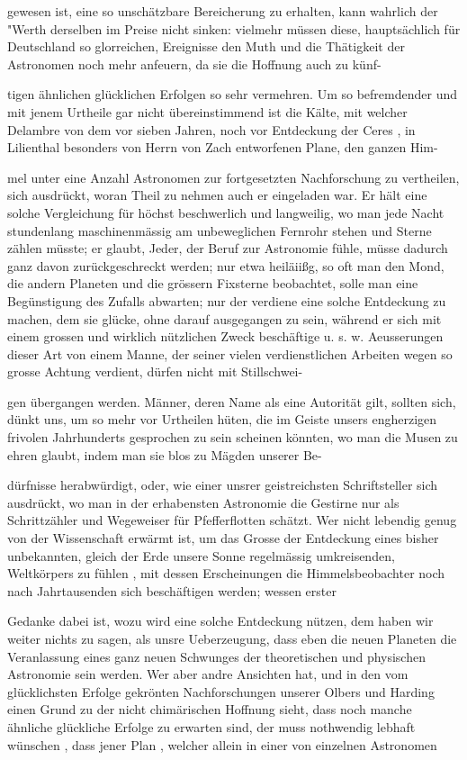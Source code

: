 \documentclass[10pt,a4paper]{article}
\begin{document}
gewesen ist, eine so unschätzbare Bereicherung zu erhalten, kann wahrlich der "Werth derselben im Preise nicht sinken: vielmehr müssen diese, hauptsächlich für Deutschland so glorreichen, Ereignisse den Muth und die Thätigkeit der Astronomen noch mehr anfeuern, da sie die Hoffnung auch zu künf-

tigen ähnlichen glücklichen Erfolgen so sehr vermehren. Um so befremdender und mit jenem Urtheile gar nicht übereinstimmend ist die Kälte, mit welcher Delambre von dem vor sieben Jahren, noch vor Entdeckung der Ceres , in Lilienthal besonders von Herrn von Zach entworfenen Plane, den ganzen Him-

mel unter eine Anzahl Astronomen zur fortgesetzten Nachforschung zu vertheilen, sich ausdrückt, woran Theil zu nehmen auch er eingeladen war. Er hält eine solche Vergleichung für höchst beschwerlich und langweilig, wo man jede Nacht stundenlang maschinenmässig am unbeweglichen Fernrohr stehen und Sterne zählen müsste; er glaubt, Jeder, der Beruf zur Astronomie fühle, müsse dadurch ganz davon zurückgeschreckt werden; nur etwa heiläiißg, so oft man den Mond, die andern Planeten und die grössern Fixsterne beobachtet, solle man eine Begünstigung des Zufalls abwarten; nur der verdiene eine solche Entdeckung zu machen, dem sie glücke, ohne darauf ausgegangen zu sein, während er sich mit einem grossen und wirklich nützlichen Zweck beschäftige u. s. w. Aeusserungen dieser Art von einem Manne, der seiner vielen verdienstlichen Arbeiten wegen so grosse Achtung verdient, dürfen nicht mit Stillschwei-

gen übergangen werden. Männer, deren Name als eine Autorität gilt, sollten sich, dünkt uns, um so mehr vor Urtheilen hüten, die im Geiste unsers engherzigen frivolen Jahrhunderts gesprochen zu sein scheinen könnten, wo man die Musen zu ehren glaubt, indem man sie blos zu Mägden unserer Be-

dürfnisse herabwürdigt, oder, wie einer unsrer geistreichsten Schriftsteller sich ausdrückt, wo man in der erhabensten Astronomie die Gestirne nur als Schrittzähler und Wegeweiser für Pfefferflotten schätzt. Wer nicht lebendig genug von der Wissenschaft erwärmt ist, um das Grosse der Entdeckung eines bisher unbekannten, gleich der Erde unsere Sonne regelmässig umkreisenden, Weltkörpers zu fühlen , mit dessen Erscheinungen die Himmelsbeobachter noch nach Jahrtausenden sich beschäftigen werden; wessen erster

Gedanke dabei ist, wozu wird eine solche Entdeckung nützen, dem haben wir weiter nichts zu sagen, als unsre Ueberzeugung, dass eben die neuen Planeten die Veranlassung eines ganz neuen Schwunges der theoretischen und physischen Astronomie sein werden. Wer aber andre Ansichten hat, und in den vom glücklichsten Erfolge gekrönten Nachforschungen unserer Olbers und Harding einen Grund zu der nicht chimärischen Hoffnung sieht, dass noch manche ähnliche glückliche Erfolge zu erwarten sind, der muss nothwendig lebhaft wünschen , dass jener Plan , welcher allein in einer von einzelnen Astronomen
\end{document}
